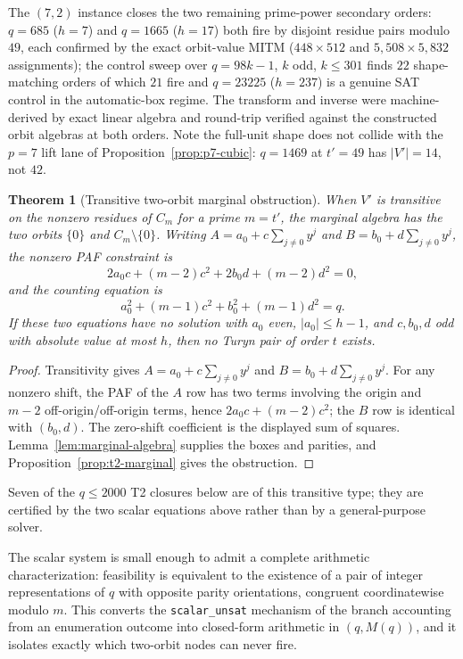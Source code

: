 \documentclass[11pt]{article}
\theoremstyle{plain}
\newtheorem{theorem}{Theorem}[section]
\theoremstyle{definition}
\theoremstyle{remark}
\begin{document}
The $(7,2)$ instance closes the two remaining prime-power secondary
orders: $q=685$ ($h=7$) and $q=1665$ ($h=17$) both fire by disjoint
residue pairs modulo $49$, each confirmed by the exact orbit-value MITM
($448\times512$ and $5{,}508\times5{,}832$ assignments); the control
sweep over $q=98k-1$, $k$ odd, $k\le301$ finds $22$ shape-matching
orders of which $21$ fire and $q=23225$ ($h=237$) is a genuine SAT
control in the automatic-box regime.  The transform and inverse were
machine-derived by exact linear algebra and round-trip verified against
the constructed orbit algebras at both orders.  Note the full-unit
shape does not collide with the $p=7$ lift lane of
Proposition~\ref{prop:p7-cubic}: $q=1469$ at $t'=49$ has $|V'|=14$, not
$42$.

\begin{theorem}[Transitive two-orbit marginal obstruction]\label{thm:t2-twoorbit}
When $V'$ is transitive on the nonzero residues of $C_m$ for a prime
$m=t'$, the marginal algebra has the two orbits $\{0\}$ and $C_m\setminus\{0\}$.
Writing
$A=a_0+c\sum_{j\ne0}y^j$ and $B=b_0+d\sum_{j\ne0}y^j$, the nonzero PAF
constraint is
\[
  2a_0c+(m-2)c^2+2b_0d+(m-2)d^2=0,
\]
and the counting equation is
\[
  a_0^2+(m-1)c^2+b_0^2+(m-1)d^2=q.
\]
If these two equations have no solution with $a_0$ even, $|a_0|\le h-1$, and
$c,b_0,d$ odd with absolute value at most $h$, then no Turyn pair of order $t$
exists.
\end{theorem}

\begin{proof}
Transitivity gives $A=a_0+c\sum_{j\ne0}y^j$ and
$B=b_0+d\sum_{j\ne0}y^j$. For any nonzero shift, the PAF of the $A$ row has two
terms involving the origin and $m-2$ off-origin/off-origin terms, hence
$2a_0c+(m-2)c^2$; the $B$ row is identical with $(b_0,d)$. The zero-shift
coefficient is the displayed sum of squares. Lemma~\ref{lem:marginal-algebra}
supplies the boxes and parities, and Proposition~\ref{prop:t2-marginal} gives
the obstruction.
\end{proof}

Seven of the $q\le2000$ T2 closures below are of this transitive type; they are
certified by the two scalar equations above rather than by a general-purpose
solver.

The scalar system is small enough to admit a complete arithmetic
characterization: feasibility is equivalent to the existence of a pair of
integer representations of $q$ with opposite parity orientations, congruent
coordinatewise modulo $m$.  This converts the \texttt{scalar\_unsat}
mechanism of the branch accounting from an enumeration outcome into
closed-form arithmetic in $(q,M(q))$, and it isolates exactly which
two-orbit nodes can never fire.
\end{document}
